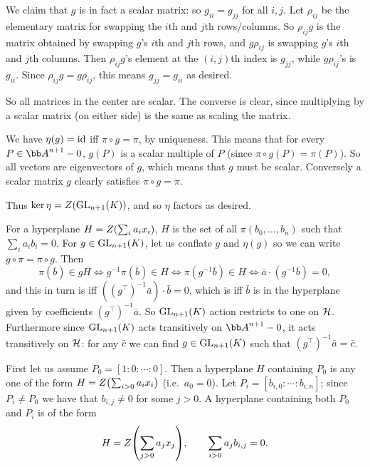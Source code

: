     We claim that $g$ is in fact a scalar matrix: so $g_{ii}=g_{jj}$ for all $i,j$.
    Let $\rho_{ij}$ be the elementary matrix for swapping the $i$th and $j$th rows/columns.
    So $\rho_{ij}g$ is the matrix obtained by swapping $g$'s $i$th and $j$th rows, and $g\rho_{ij}$ is swapping $g$'s $i$th and $j$th columns.
    Then $\rho_{ij}g$'s element at the $(i,j)$th index is $g_{jj}$, while $g\rho_{ij}$'s is $g_{ii}$.
    Since $\rho_{ij}g=g\rho_{ij}$, this means $g_{jj}=g_{ii}$ as desired.

    So all matrices in the center are scalar.
    The converse is clear, since multiplying by a scalar matrix (on either side) is the same as scaling the matrix.

    \item We have $\eta(g)={\rm id}$ iff $\pi\circ g=\pi$, by uniqueness.
    This means that for every $P\in\bA^{n+1}-0$, $g(P)$ is a scalar multiple of $P$ (since $\pi\circ g(P)=\pi(P)$).
    So all vectors are eigenvectors of $g$, which means that $g$ must be scalar.
    Conversely a scalar matrix $g$ clearly satisfies $\pi\circ g=\pi$.

    Thus $\mathop{\rm ker}\eta=Z({\rm GL}_{n+1}(K))$, and so $\eta$ factors as desired.

    \item For a hyperplane $H=Z\mathopen{}\mathclose{\left(\sum_ia_ix_i\right)}$, $H$ is the set of all $\pi(b_0,\dots,b_n)$ such that $\sum_ia_ib_i=0$.
    For $g\in{\rm GL}_{n+1}(K)$, let us conflate $g$ and $\eta(g)$ so we can write $g\circ\pi=\pi\circ g$.
    Then
    $$ \pi(\bar b) \in gH \iff g^{-1}\pi(\bar b) \in H \iff \pi(g^{-1}\bar b) \in H \iff \bar a\cdot(g^{-1}\bar b) = 0 , $$
    and this in turn is iff $((g^\top)^{-1}\bar a)\cdot\bar b=0$, which is iff $\bar b$ is in the hyperplane given by coefficients $(g^\top)^{-1}\bar a$.
    So ${\rm GL}_{n+1}(K)$ action restricts to one on ${\cal H}$.
    Furthermore since ${\rm GL}_{n+1}(K)$ acts transitively on $\bA^{n+1}-0$, it acts transitively on ${\cal H}$: for any $\bar c$ we can find $g\in{\rm GL}_{n+1}(K)$ such that $(g^\top)^{-1}\bar a=\bar c$.

    \item First let us assume $P_0=[1:0:\cdots:0]$.
    Then a hyperplane $H$ containing $P_0$ is any one of the form $H=Z\mathopen{}\mathclose{\left(\sum_{i>0}a_ix_i\right)}$ (i.e.\ $a_0=0$).
    Let $P_i=[b_{i,0}:\cdots:b_{i,n}]$; since $P_i\neq P_0$ we have that $b_{i,j}\neq0$ for some $j>0$.
    A hyperplane containing both $P_0$ and $P_i$ is of the form
    $$ H = Z\mathopen{}\mathclose{\left(\sum_{j>0}a_jx_j\right)},\qquad \sum_{i>0}a_jb_{i,j} = 0 . $$

